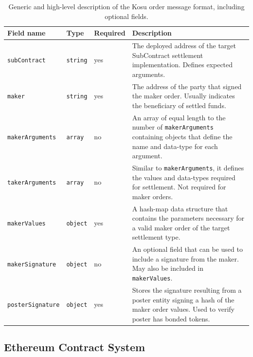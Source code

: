 \documentclass[10pt]{article}
\begin{document}
\bgroup
\def\arraystretch{1.2}
\begin{table}[H]
\centering
\label{table:table2}
\begin{tabularx}{1\textwidth}{|l|l|l|X|}
\hline
\textbf{Field name} & \textbf{Type} & \textbf{Required} & \textbf{Description} \\
\hline
\texttt{subContract} & \texttt{string} & yes & The deployed address of the target SubContract settlement implementation. Defines expected arguments. \\
\hline
\texttt{maker} & \texttt{string} & yes & The address of the party that signed the maker order. Usually indicates the beneficiary of settled funds. \\
\hline
\texttt{makerArguments} & \texttt{array} & no & An array of equal length to the number of \texttt{makerArguments} containing objects that define the name and data-type for each argument. \\
\hline
\texttt{takerArguments} & \texttt{array} & no & Similar to \texttt{makerArguments}, it defines the values and data-types required for settlement. Not required for maker orders. \\
\hline
\texttt{makerValues} & \texttt{object} & yes & A hash-map data structure that contains the parameters necessary for a valid maker order of the target settlement type. \\
\hline
\texttt{makerSignature} & \texttt{object} & no & An optional field that can be used to include a signature from the maker. May also be included in \texttt{makerValues}. \\
\hline
\texttt{posterSignature} & \texttt{object} & yes & Stores the signature resulting from a poster entity signing a hash of the maker order values. Used to verify poster has bonded tokens. \\
\hline
\end{tabularx}
\caption{Generic and high-level description of the Kosu order message format, including optional fields.} 
\end{table}
\egroup

\subsection{Ethereum Contract System}\label{ethereum-contract-system}
\end{document}
